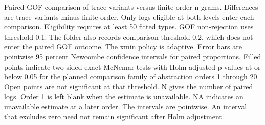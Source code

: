 Paired GOF comparison of trace variants versus finite-order n-grams. Differences are trace variants minus finite order. Only logs eligible at both levels enter each comparison. Eligibility requires at least 50 fitted types. GOF non-rejection uses threshold 0.1. The folder also records comparison threshold 0.2, which does not enter the paired GOF outcome. The xmin policy is adaptive. Error bars are pointwise 95 percent Newcombe confidence intervals for paired proportions. Filled points indicate two-sided exact McNemar tests with Holm-adjusted p-values at or below 0.05 for the planned comparison family of abstraction orders 1 through 20. Open points are not significant at that threshold. N gives the number of paired logs. Order 1 is left blank when the estimate is unavailable. NA indicates an unavailable estimate at a later order. The intervals are pointwise. An interval that excludes zero need not remain significant after Holm adjustment.
